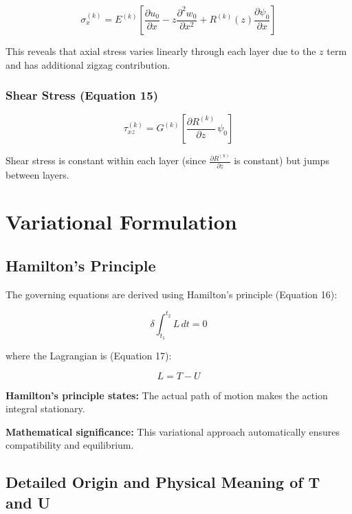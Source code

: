 \documentclass[12pt,a4paper]{article}
\begin{document}
\begin{equation}
\sigma_x^{(k)} = E^{(k)} \left[
\frac{\partial u_0}{\partial x}
- z \frac{\partial^2 w_0}{\partial x^2}
+ R^{(k)}(z) \frac{\partial \psi_0}{\partial x}
\right]
\end{equation}

This reveals that axial stress varies linearly through each layer due to the $z$ term and has additional zigzag contribution.

\subsubsection{Shear Stress (Equation 15)}

\begin{equation}
\tau_{xz}^{(k)} = G^{(k)} \left[
\frac{\partial R^{(k)}}{\partial z} \, \psi_0
\right]
\end{equation}

Shear stress is constant within each layer (since $\frac{\partial R^{(k)}}{\partial z}$ is constant) but jumps between layers.

\section{Variational Formulation}

\subsection{Hamilton's Principle}

The governing equations are derived using Hamilton's principle (Equation 16):

\begin{equation}
\delta \int_{t_1}^{t_2} L \, dt = 0
\end{equation}

where the Lagrangian is (Equation 17):

\begin{equation}
L = T - U
\end{equation}

\textbf{Hamilton's principle states:} The actual path of motion makes the action integral stationary.

\textbf{Mathematical significance:} This variational approach automatically ensures compatibility and equilibrium.

\subsection{Detailed Origin and Physical Meaning of T and U}
\end{document}
